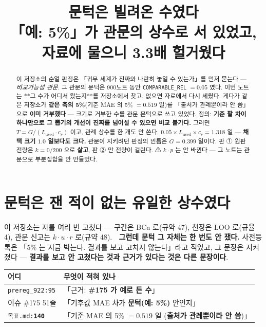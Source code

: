 \documentclass{article}
\title{문턱은 빌려온 수였다 \\
  {\large 「예: 5\%」가 관문의 상수로 서 있었고, 자료에 물으니 \textbf{3.3배} 헐거웠다}}
\begin{document}
\maketitle

\begin{abstract}
이 저장소의 순열 판정은 「귀무 세계가 진짜와 나란히 놓일 수 있는가」를 먼저 묻는다 ---
\emph{비교가능성 관문}. 그 관문의 문턱은 900노트 동안 \texttt{COMPARABLE\_REL} $=0.05$ 였다.
이번 노트는 **그 수가 어디서 왔는지**를 저장소에서 찾고, 없으면 자료에서 다시 세웠다.
{게다가 같은 저장소가 \textbf{같은 축의 5\%}(기준 MAE 의 5\% $=0.519$ 일)를
「출처가 관례뿐이라 안 씀」으로 \textbf{이미 거부했다} --- 크기로 거부한 수를 관문 문턱으로 쓰고 있었다.}
{정의: \textbf{기준 팔 차이 하나만으로 그 뽑기의 개선이 진짜를 넘어설 수 있으면 비교 불가다.}
그러면 $T=G/(L_{\mathrm{used}}\cdot c_r)$ 이고, 관례 상수를 한 개도 안 쓴다.}
{$0.05\times L_{\mathrm{used}}\times c_r = \mathbf{1.318}$ 일 --- \textbf{채택 크기 $1.0$ 일보다도 크다.}
관문이 지키려던 판정의 빈틈은 $G=0.399$ 일이다.}
{판 ① 원판 전량은 $k=0/200$ 으로 \textbf{살고}, 판 ② 만 전량이 걸린다.
⚠ $k\cdot p$ 는 안 바뀐다 --- 그 노트는 관문으로 부분집합을 안 만들었다.}
\end{abstract}

\section{문턱은 잰 적이 없는 유일한 상수였다}

이 저장소는 자를 여러 번 고쳤다 --- 구간은 BCa 로(규약 47), 천장은 LOO 로(규율 4),
관문 신고는 $k\cdot u\cdot r$ 로(규약 48). 🔴 \textbf{그런데 문턱 그 자체는 한 번도 안 쟀다.}
사전등록은 「5\% 는 지금 박는다. 결과를 보고 고치지 않는다」라고 적었고, 그 문장은 지켜졌다 ---
\textbf{결과를 보고 안 고쳤다는 것과 근거가 있다는 것은 다른 문장이다}.

\begin{table}[h]\centering\small
\begin{tabular}{ll}
\toprule
어디 & 무엇이 적혀 있나 \\
\midrule
\texttt{prereg\_922:95} & 「근거: \textbf{\#175 가 예로 든 수}」 \\
이슈 \#175 51줄 & 「기후값 MAE 차가 \textbf{문턱(예: 5\%)} 안인지」 \\
\texttt{목표.md:\textbf{140}} & 「기준 MAE 의 5\% $=0.519$ 일 (\textbf{출처가 관례뿐이라 안 씀})」 \\
\bottomrule
\end{tabular}
\end{table}
\end{document}
